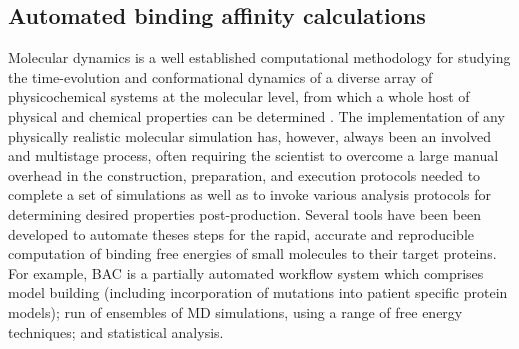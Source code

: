 

\subsection{Automated binding affinity calculations}

Molecular dynamics is a well established computational methodology for
studying the time-evolution and conformational dynamics of a diverse array of
physicochemical systems at the molecular level, from which a whole host of
physical and chemical properties can be determined \cite{Karplus2005}. The
implementation of any physically realistic molecular simulation has, however,
always been an involved and multistage process, often requiring the scientist
to overcome a large manual overhead in the construction, preparation, and
execution protocols needed to complete a set of simulations as well as to
invoke various analysis protocols for determining desired properties 
post-production. Several tools have been been developed to automate theses steps
for the rapid, accurate and reproducible computation of binding free energies
of small molecules to their target proteins. For example, BAC\cite{Sadiq2008}
is a partially automated workflow system which comprises model building
(including incorporation of mutations into patient specific protein
models); run of ensembles of MD simulations, using a range of free energy
techniques; and statistical analysis.


